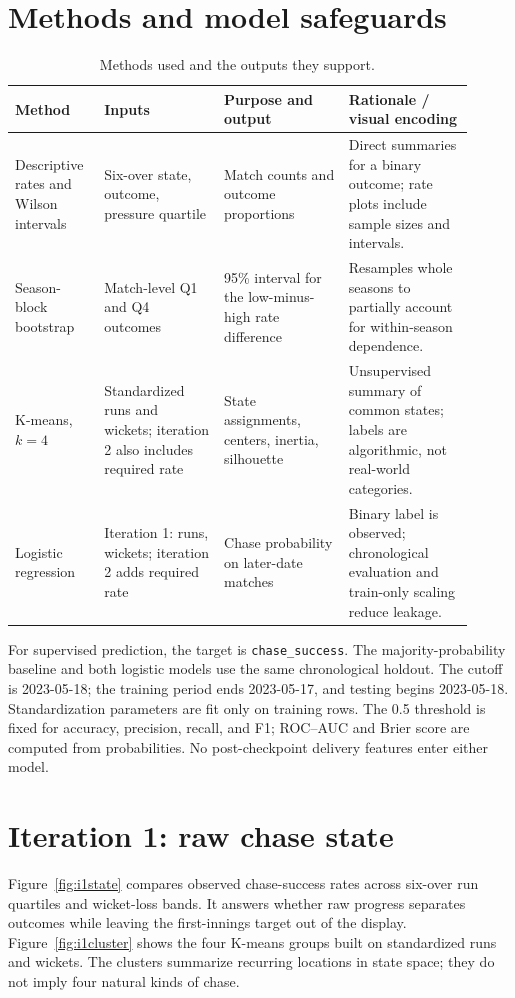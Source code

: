 \documentclass[11pt]{article}
\begin{document}
\section{Methods and model safeguards}
\begin{table}[H]
\centering\small
\begin{tabular}{p{0.17\linewidth}p{0.24\linewidth}p{0.25\linewidth}p{0.25\linewidth}}
\toprule
Method & Inputs & Purpose and output & Rationale / visual encoding \\
\midrule
Descriptive rates and Wilson intervals & Six-over state, outcome, pressure quartile & Match counts and outcome proportions & Direct summaries for a binary outcome; rate plots include sample sizes and intervals. \\
Season-block bootstrap & Match-level Q1 and Q4 outcomes & 95\% interval for the low-minus-high rate difference & Resamples whole seasons to partially account for within-season dependence. \\
K-means, $k=4$ & Standardized runs and wickets; iteration 2 also includes required rate & State assignments, centers, inertia, silhouette & Unsupervised summary of common states; labels are algorithmic, not real-world categories. \\
Logistic regression & Iteration 1: runs, wickets; iteration 2 adds required rate & Chase probability on later-date matches & Binary label is observed; chronological evaluation and train-only scaling reduce leakage. \\
\bottomrule
\end{tabular}
\caption{Methods used and the outputs they support.}
\label{tab:methods}
\end{table}

For supervised prediction, the target is \texttt{chase\_success}. The majority-probability baseline and both logistic models use the same chronological holdout. The cutoff is 2023-05-18; the training period ends 2023-05-17, and testing begins 2023-05-18. Standardization parameters are fit only on training rows. The 0.5 threshold is fixed for accuracy, precision, recall, and F1; ROC--AUC and Brier score are computed from probabilities. No post-checkpoint delivery features enter either model.

\section{Iteration 1: raw chase state}
Figure~\ref{fig:i1state} compares observed chase-success rates across six-over run quartiles and wicket-loss bands. It answers whether raw progress separates outcomes while leaving the first-innings target out of the display. Figure~\ref{fig:i1cluster} shows the four K-means groups built on standardized runs and wickets. The clusters summarize recurring locations in state space; they do not imply four natural kinds of chase.
\end{document}
